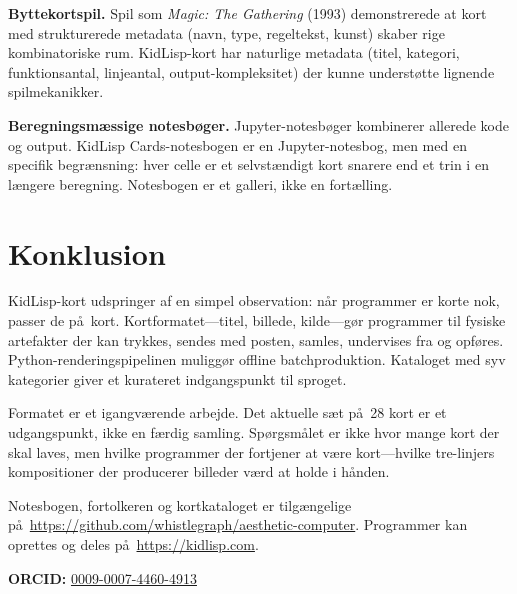 \documentclass[10pt,letterpaper,twocolumn]{article}
\begin{document}
\textbf{Byttekortspil.} Spil som \emph{Magic: The Gathering} (1993) demonstrerede at kort med strukturerede metadata (navn, type, regeltekst, kunst) skaber rige kombinatoriske rum. KidLisp-kort har naturlige metadata (titel, kategori, funktionsantal, linjeantal, output-kompleksitet) der kunne underst\o tte lignende spilmekanikker.

\textbf{Beregningsmæssige notesbøger.} Jupyter-notesbøger kombinerer allerede kode og output. KidLisp Cards-notesbogen er en Jupyter-notesbog, men med en specifik begr\ae nsning: hver celle er et selvst\ae ndigt kort snarere end et trin i en l\ae ngere beregning. Notesbogen er et galleri, ikke en fort\ae lling.


\section{Konklusion}

KidLisp-kort udspringer af en simpel observation: n\aa r programmer er korte nok, passer de p\aa\ kort. Kortformatet---titel, billede, kilde---g\o r programmer til fysiske artefakter der kan trykkes, sendes med posten, samles, undervises fra og opf\o res. Python-renderingspipelinen muligg\o r offline batchproduktion. Kataloget med syv kategorier giver et kurateret indgangspunkt til sproget.

Formatet er et igangv\ae rende arbejde. Det aktuelle s\ae t p\aa\ 28 kort er et udgangspunkt, ikke en f\ae rdig samling. Sp\o rgsm\aa let er ikke hvor mange kort der skal laves, men hvilke programmer der fortjener at v\ae re kort---hvilke tre-linjers kompositioner der producerer billeder v\ae rd at holde i h\aa nden.

Notesbogen, fortolkeren og kortkataloget er tilg\ae ngelige p\aa\ \url{https://github.com/whistlegraph/aesthetic-computer}. Programmer kan oprettes og deles p\aa\ \url{https://kidlisp.com}.

\vspace{0.5em}
\noindent\textbf{ORCID:} \href{https://orcid.org/0009-0007-4460-4913}{0009-0007-4460-4913}




\end{document}
